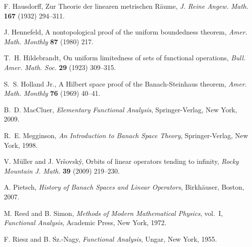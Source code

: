 \documentclass[12pt]{article}
\begin{document}
\begin{thebibliography}{199}
  F. Hausdorff, Zur Theorie der linearen metrischen
   R\"aume, {\em J. Reine Angew. Math.}\/ {\bf 167} (1932) 294--311.

  J. Hennefeld, A nontopological proof of the
   uniform boundedness theorem,
   {\em Amer. Math. Monthly}\/ {\bf 87} (1980) 217.

  T.~H. Hildebrandt, On uniform limitedness of sets
   of functional operations, {\em Bull. Amer. Math. Soc.}\/
   {\bf 29} (1923) 309--315.

  S.~S. Holland Jr., A Hilbert space proof of the
   Banach-Steinhaus theorem,
   {\em Amer. Math. Monthly}\/ {\bf 76} (1969) 40--41.

  B.~D. MacCluer, {\em Elementary Functional Analysis}\/,
   Springer-Verlag, New York, 2009.

  R.~E. Megginson, {\em An Introduction to Banach Space
   Theory}\/, Springer-Verlag, New York, 1998.

  V. M\"uller and J. Vr\v{s}ovsk\'y,
   Orbits of linear operators tending to infinity,
   {\em Rocky Mountain J. Math.}\/ {\bf 39} (2009) 219--230.


  A. Pietsch, {\em History of Banach Spaces and
   Linear Operators}\/, Birkh\"auser, Boston, 2007.

  M. Reed and B. Simon, {\em Methods of Modern Mathematical
   Physics}\/, vol.~I, {\em Functional Analysis}\/,
   Academic Press, New York, 1972.

  F. Riesz and B. Sz.-Nagy, {\em Functional Analysis}\/,
   Ungar, New York, 1955.




\end{thebibliography}
\end{document}
